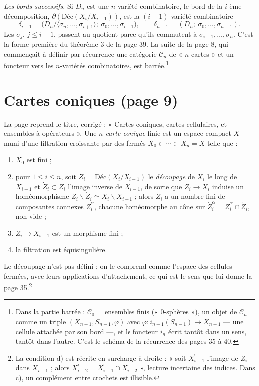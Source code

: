 \documentclass[11pt,a4paper]{article}
\begin{document}
\emph{Les bords successifs.} Si $D_n$ est une $n$-variété combinatoire, le
bord de la $i$-ème décomposition, $\partial(\mathrm{Déc}(X_i/X_{i-1}))$, est
la $(i-1)$-variété combinatoire
\[
  \delta_{i-1} = \bigl(D_n/\langle \sigma_n, \ldots, \sigma_{i+1} \rangle
  ;\ \sigma_0, \ldots, \sigma_{i-1}\bigr) ,
  \qquad \delta_{n-1} = (D_n ;\ \sigma_0, \ldots, \sigma_{n-1}) .
\]
Les $\sigma_j$, $j \leqslant i - 1$, passent au quotient parce qu'ils
commutent à $\sigma_{i+1}, \ldots, \sigma_n$. C'est la forme première du
théorème 3 de la page 39. La suite de la page 8, qui commençait à définir par
récurrence une catégorie $\mathcal{C}_n$ de « $n$-cartes » et un foncteur vers
les $n$-variétés combinatoires, est barrée.\footnote{Dans la partie barrée :
$\mathcal{C}_0$ = ensembles finis (« 0-sphères »), un objet de
$\mathcal{C}_n$ comme un triple $(X_{n-1}, S_{n-1}, \varphi)$ avec
$\varphi : i_{n-1}(S_{n-1}) \to X_{n-1}$ --- une cellule attachée par son bord
---, et le foncteur $i_n$ écrit tantôt dans un sens, tantôt dans l'autre.
C'est le schéma de la récurrence des pages 35 à 40.}

\section*{Cartes coniques (page 9)}

La page reprend le titre, corrigé : « Cartes coniques, cartes cellulaires, et
ensembles à opérateurs ». Une \emph{$n$-carte conique} finie est un espace
compact $X$ muni d'une filtration croissante par des fermés
$X_0 \subset \cdots \subset X_n = X$ telle que :
\begin{enumerate}
  \item[a)] $X_0$ est fini ;
  \item[b)] pour $1 \leqslant i \leqslant n$, soit $\overline{Z}_i =
  \mathrm{Déc}(X_i/X_{i-1})$ le \emph{découpage} de $X_i$ le long de
  $X_{i-1}$ et $\dot Z_i \subset \overline{Z}_i$ l'image inverse de $X_{i-1}$,
  de sorte que $\overline{Z}_i \to X_i$ induise un homéomorphisme
  $\overline{Z}_i \smallsetminus \dot Z_i \simeq X_i \smallsetminus X_{i-1}$ ;
  alors $\overline{Z}_i$ a un nombre fini de composantes connexes
  $\overline{Z}_i^\alpha$, chacune homéomorphe au cône sur $\dot Z_i^\alpha =
  \overline{Z}_i^\alpha \cap \dot Z_i$, non vide ;
  \item[c)] $\dot Z_i \to X_{i-1}$ est un morphisme fini ;
  \item[d)] la filtration est équisingulière.
\end{enumerate}
Le découpage n'est pas défini ; on le comprend comme l'espace des cellules
fermées, avec leurs applications d'attachement, ce qui est le sens que lui
donne la page 35.\footnote{La condition d) est récrite en surcharge à droite :
« soit $X_{i-1}^!$ l'image de $\dot Z_i$ dans $X_{i-1}$ ; alors $X_{i-2}^! =
X_{i-1}^! \cap X_{i-2}$ », lecture incertaine des indices. Dans c), un
complément entre crochets est illisible.}
\end{document}
